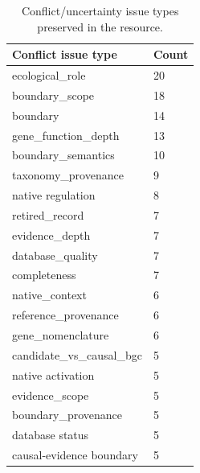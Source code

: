 \begin{table}[htbp]
\centering
\caption{Conflict/uncertainty issue types preserved in the resource.}
\label{tab:conflicts}
\begin{tabular}{l l}
\toprule
Conflict issue type & Count \\
\midrule
ecological\_role & 20 \\
boundary\_scope & 18 \\
boundary & 14 \\
gene\_function\_depth & 13 \\
boundary\_semantics & 10 \\
taxonomy\_provenance & 9 \\
native regulation & 8 \\
retired\_record & 7 \\
evidence\_depth & 7 \\
database\_quality & 7 \\
completeness & 7 \\
native\_context & 6 \\
reference\_provenance & 6 \\
gene\_nomenclature & 6 \\
candidate\_vs\_causal\_bgc & 5 \\
native activation & 5 \\
evidence\_scope & 5 \\
boundary\_provenance & 5 \\
database status & 5 \\
causal-evidence boundary & 5 \\
\bottomrule
\end{tabular}
\end{table}